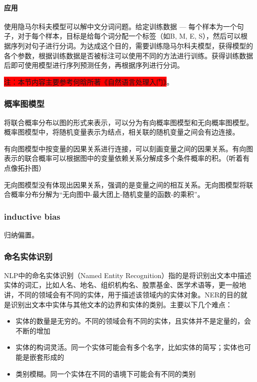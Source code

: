 \paragraph{应用}使用隐马尔科夫模型可以解中文分词问题。给定训练数据 --- 每个样本为一个句子，对于每个样本，目标是给每个词分配一个标签（如{B, M, E, S}），然后可以根据序列对句子进行分词。为达成这个目的，需要训练隐马尔科夫模型，获得模型的各个参数，根据训练数据是否被标注可以使用不同的方法进行训练。获得训练数据后即可使用模型进行序列预测任务，再根据序列进行分词。


\colorbox{red}{注：本节内容主要参考何晗所著《自然语言处理入门》}。


\subsubsection{概率图模型}
将联合概率分布以图的形式来表示，可以分为有向概率图模型和无向概率图模型。
概率图模型中，将随机变量表示为结点，相关联的随机变量之间会有边连接。

有向图模型中按变量的因果关系进行连接，可以刻画变量之间的因果关系。有向图表示的联合概率可以根据图中的变量依赖关系分解成多个条件概率的积。（听着有点像拓扑图）

无向图模型没有体现出因果关系，强调的是变量之间的相互关系。无向图模型将联合概率分布分解为“无向图中-最大团上-随机变量的函数-的乘积”。

\subsubsection{inductive bias}
归纳偏置。


\subsubsection{命名实体识别}
NLP中的命名实体识别（Named Entity Recognition）指的是将识别出文本中描述实体的词汇，比如人名、地名、组织机构名、股票基金、医学术语等，更一般地讲，不同的领域会有不同的实体，用于描述该领域内的实体对象。NER的目的就是识别出文本中实体与其他文本的边界和实体的类别。主要以下几个难点：
\begin{itemize}
	\item 实体的数量是无穷的。不同的领域会有不同的实体，且实体并不是定量的，会不断的增加
	\item 实体的构词灵活。同一个实体可能会有多个名字，比如实体的简写；实体也可能是嵌套形成的
	\item 类别模糊。同一个实体在不同的语境下可能会有不同的类别
\end{itemize}

